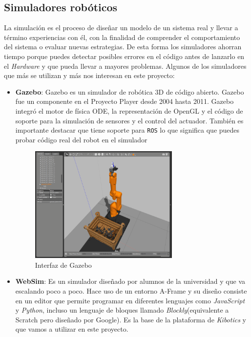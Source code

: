 \subsection{Simuladores robóticos}
\label{sec:simuladores}
La simulación  es el proceso de diseñar un modelo de un sistema real y llevar a término experiencias con él, con la finalidad de comprender el comportamiento del sistema o evaluar nuevas estrategias. De esta forma los simuladores ahorran tiempo porque puedes detectar posibles errores en el código antes de lanzarlo en el \textit{Hardware} y que pueda llevar a mayores problemas.\newline
Algunos de los simuladores que más se utilizan y más nos interesan en este proyecto:
\begin{itemize}
    \item \textbf{Gazebo}\cite{bib:Gazebo}: Gazebo es un simulador de robótica 3D de código abierto. Gazebo fue un componente en el Proyecto Player desde 2004 hasta 2011. Gazebo integró el motor de física ODE, la representación de OpenGL y el código de soporte para la simulación de sensores y el control del actuador. También es importante destacar que tiene soporte para \texttt{ROS} lo que significa que puedes probar código real del robot en el simulador
    \begin{figure}[H]
    \centering
    \includegraphics[width=0.7\textwidth]{img/gazebo.png}
    \caption{Interfaz de Gazebo} \label{fig:gazebo}
    \end{figure}
    
    \item \textbf{WebSim}: Es un simulador diseñado por alumnos de la universidad y que va escalando poco a poco. Hace uso de un entorno A-Frame y su diseño consiste en un editor que permite programar en diferentes lenguajes como \textit{JavaScript} y \textit{Python}, incluso un lenguaje de bloques llamado \textit{Blockly}(equivalente a Scratch pero diseñado por Google). Es la base de la plataforma de \textit{Kibotics} y que vamos a utilizar en este proyecto.
\end{itemize}


